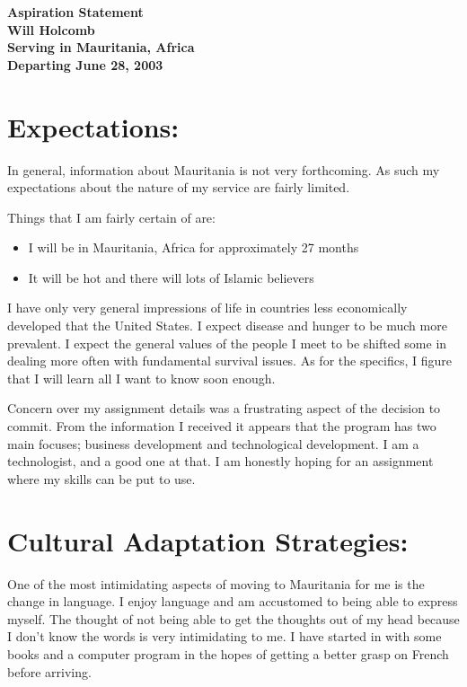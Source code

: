 \documentclass[12pt,a4paper,twoside]{article}  %
\def\author{Will Holcomb}
\def\depdate{June 28, 2003}
\begin{document}
\thispagestyle{empty} %

\begin{center}
{\bf \Huge Aspiration Statement} \\
{\bf \author} \\
{\bf Serving in Mauritania, Africa} \\
{\bf Departing \depdate}
\end{center}

\section{Expectations:}

In general, information about Mauritania is not very forthcoming. As
such my expectations about the nature of my service are fairly
limited.

Things that I am fairly certain of are:

\begin{itemize}
\item I will be in Mauritania, Africa for approximately 27 months
\item It will be hot and there will lots of Islamic believers
\end{itemize}

I have only very general impressions of life in countries less
economically developed that the United States. I expect disease and
hunger to be much more prevalent. I expect the general values of the
people I meet to be shifted some in dealing more often with
fundamental survival issues. As for the specifics, I figure that I
will learn all I want to know soon enough.

Concern over my assignment details was a frustrating aspect of the
decision to commit. From the information I received it appears that
the program has two main focuses; business development and
technological development. I am a technologist, and a good one at
that. I am honestly hoping for an assignment where my skills can be
put to use.

\section{Cultural Adaptation Strategies:}

One of the most intimidating aspects of moving to Mauritania for me is
the change in language. I enjoy language and am accustomed to being
able to express myself. The thought of not being able to get the
thoughts out of my head because I don't know the words is very
intimidating to me. I have started in with some books and a computer
program in the hopes of getting a better grasp on French before
arriving.
\end{document}
